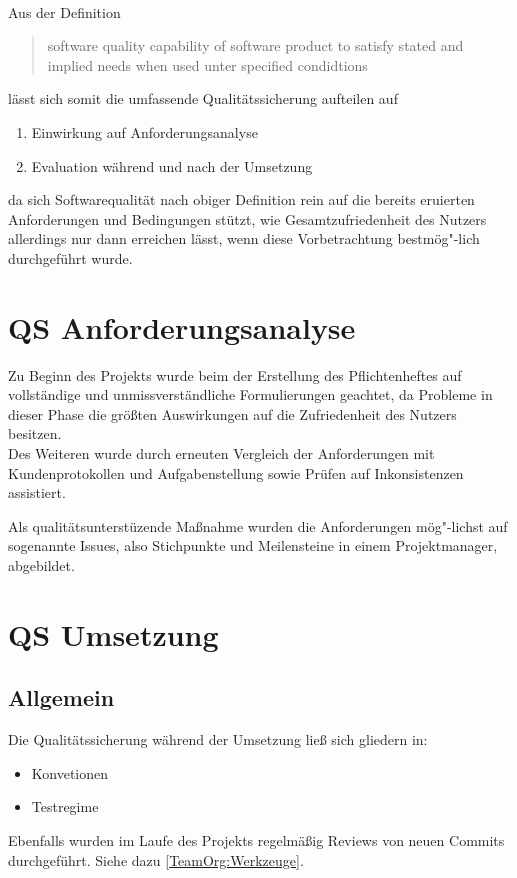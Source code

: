 \paragraph*{}Aus der Definition
\begin{quote}\label{PD_SQ}
software quality
capability of software product to satisfy stated and implied needs when used unter specified condidtions \cite[4 Terms and definitions]{ISO25000:2014}
\end{quote}
lässt sich somit die umfassende Qualitätssicherung aufteilen auf
\begin{enumerate}
\item Einwirkung auf Anforderungsanalyse
\item Evaluation während und nach der Umsetzung
\end{enumerate}
da sich Softwarequalität nach obiger Definition rein auf die bereits eruierten Anforderungen und Bedingungen stützt, wie Gesamtzufriedenheit des Nutzers allerdings nur dann erreichen lässt, wenn diese Vorbetrachtung bestmög"-lich durchgeführt wurde.
\section{QS Anforderungsanalyse}
Zu Beginn des Projekts wurde beim der Erstellung des Pflichtenheftes auf vollständige und unmissverständliche Formulierungen geachtet, da Probleme in dieser Phase die größten Auswirkungen auf die Zufriedenheit des Nutzers besitzen.\\
Des Weiteren wurde durch erneuten Vergleich der Anforderungen mit Kundenprotokollen und Aufgabenstellung sowie Prüfen auf Inkonsistenzen assistiert.

Als qualitätsunterstüzende Maßnahme wurden die Anforderungen mög"-lichst auf sogenannte Issues, also Stichpunkte und Meilensteine in einem Projektmanager, abgebildet.
\section{QS Umsetzung}
\subsection{Allgemein}
Die Qualitätssicherung während der Umsetzung ließ sich gliedern in:
\begin{itemize}
\item Konvetionen
\item Testregime
\end{itemize}
Ebenfalls wurden im Laufe des Projekts regelmäßig Reviews von neuen Commits durchgeführt. Siehe dazu \ref{TeamOrg:Werkzeuge}.
